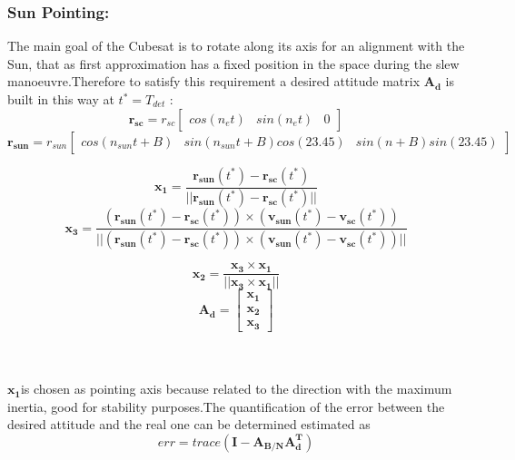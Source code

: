 \documentclass[11pt]{article}
\begin{document}
 \subsubsection{Sun Pointing:} \label{sun}
 The main goal of the Cubesat is to rotate along its axis for an alignment with the Sun, that as first approximation has a fixed position in the space during the slew manoeuvre.Therefore to satisfy this requirement a desired attitude matrix $ \mathbf{A_d}  $ is built in this way at $t^*=T_{det}$ :
  \begin{equation}
     \mathbf{r_{sc}}=r_{sc}\begin{bmatrix}
     cos(n_et)&sin(n_et)&0
     \end{bmatrix}
 \end{equation}
 \begin{equation}
     \mathbf{r_{sun}}=r_{sun}\begin{bmatrix}
   cos(n_{sun}t+B)& sin(n_{sun}t+B)cos(23.45)& sin(n+B)sin(23.45)
     \end{bmatrix}    
 \end{equation}
 \begin{minipage}{.5\textwidth}
 \begin{equation}
\mathbf{x_1}=\frac{\mathbf{r_{sun}}(t^*)-\mathbf{r_{sc}}(t^*)}{||\mathbf{r_{sun}}(t^*)-\mathbf{r_{sc}}(t^*)||}
 \end{equation}
  \begin{equation}
 \mathbf{x_3}=\frac{(\mathbf{r_{sun}}(t^*)-\mathbf{r_{sc}}(t^*)) \times (\mathbf{v_{sun}}(t^*)-\mathbf{v_{sc}}(t^*))}{||(\mathbf{r_{sun}}(t^*)-\mathbf{r_{sc}}(t^*)) \times (\mathbf{v_{sun}}(t^*)-\mathbf{v_{sc}}(t^*))||}
 \end{equation}
 \end{minipage}
 \begin{minipage}{.5\textwidth}
  \begin{equation}
 \mathbf{x_2}=\frac{\mathbf{x_3}\times\mathbf{x_1}}{||\mathbf{x_3}\times\mathbf{x_1}||}
 \end{equation}
 \begin{equation}
 \mathbf{A_d}=\begin{bmatrix}
 \mathbf{x_1}\\
  \mathbf{x_2}\\
 \mathbf{x_3}
 \end{bmatrix}
 \end{equation}
 \end{minipage}\\\\
  $ \mathbf{x_1} $is chosen as pointing axis because related to the direction with the maximum inertia, good for stability purposes.The quantification of the error between the desired attitude and the real one can be determined estimated as
  \begin{equation}
      err=trace(\mathbf{I}-\mathbf{A_{B/N}A_d^T})
  \end{equation}
\end{document}
